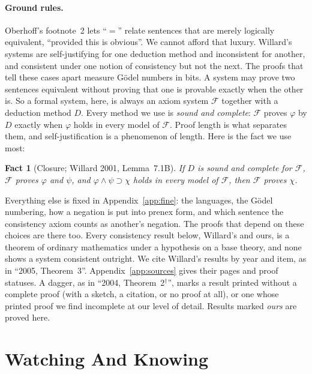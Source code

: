 \documentclass[11pt]{article}
\newcommand{\F}{\mathcal{F}}
\newcommand{\sk}{\ensuremath{^\dagger}}    %
\theoremstyle{plain}
\newtheorem{fact}[theorem]{Fact}
\theoremstyle{definition}
\begin{document}
\paragraph{Ground rules.} Oberhoff's footnote~2 lets ``$=$'' relate sentences
that are merely logically equivalent, ``provided this is obvious''. We cannot
afford that luxury. Willard's systems are self-justifying for one deduction
method and inconsistent for another, and consistent under one notion of
consistency but not the next. The proofs that tell these cases apart measure
Gödel numbers in bits. A system may prove two sentences equivalent without
proving that one is provable exactly when the other is. So a formal system,
here, is always an axiom system $\F$ together with a deduction method $D$.
Every method we use is \emph{sound and complete}: $\F$ proves $\varphi$ by $D$
exactly when $\varphi$ holds in every model of $\F$. Proof length is what
separates them, and self-justification is a phenomenon of length. Here is the
fact we use most:

\begin{fact}[Closure; Willard 2001, Lemma~7.1B]\label{fact:closure}
If $D$ is sound and complete for $\F$, $\F$ proves $\varphi$ and $\psi$, and
$\varphi \wedge \psi \supset \chi$ holds in every model of $\F$, then $\F$
proves $\chi$.
\end{fact}

\noindent
Everything else is fixed in Appendix~\ref{app:fine}: the languages, the
Gödel numbering, how a negation is put into prenex form, and which sentence
the consistency axiom counts as another's negation. The proofs that depend on
these choices are there too. Every consistency result below, Willard's and
ours, is a theorem of ordinary mathematics under a hypothesis on a base
theory, and none shows a system consistent outright. We cite Willard's
results by year and item, as in ``2005, Theorem~3''. Appendix~\ref{app:sources}
gives their pages and proof statuses. A dagger, as in ``2004,
Theorem~2\sk'', marks a result printed without a complete proof (with a
sketch, a citation, or no proof at all), or one whose printed proof we find
incomplete at our level of detail. Results marked \emph{ours} are proved
here.

\section{Watching And Knowing}
\label{sec:faith}
\end{document}
